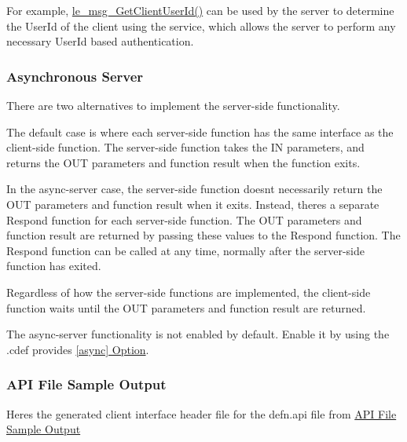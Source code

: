 For example, \hyperlink{le__messaging_8h_a8c04f9cad0a768b4922a9987df84b65f}{le\+\_\+msg\+\_\+\+Get\+Client\+User\+Id()} can be used by the server to determine the User\+Id of the client using the service, which allows the server to perform any necessary User\+Id based authentication.\hypertarget{interface_def_lang_c_interfaceDefLangC_asyncServer}{}\subsubsection{Asynchronous Server}\label{interface_def_lang_c_interfaceDefLangC_asyncServer}
There are two alternatives to implement the server-\/side functionality.

The default case is where each server-\/side function has the same interface as the client-\/side function. The server-\/side function takes the I\+N parameters, and returns the O\+U\+T parameters and function result when the function exits.

In the async-\/server case, the server-\/side function doesn\textquotesingle{}t necessarily return the O\+U\+T parameters and function result when it exits. Instead, there\textquotesingle{}s a separate {\ttfamily Respond} function for each server-\/side function. The O\+U\+T parameters and function result are returned by passing these values to the {\ttfamily Respond} function. The {\ttfamily Respond} function can be called at any time, normally after the server-\/side function has exited.

Regardless of how the server-\/side functions are implemented, the client-\/side function waits until the O\+U\+T parameters and function result are returned.

The async-\/server functionality is not enabled by default. Enable it by using the .cdef provides \hyperlink{def_files_cdef_defFilesCdef_providesApiAsync}{\mbox{[}async\mbox{]} Option}.\hypertarget{interface_def_lang_c_interfaceDefLangC_sampleAPI}{}\subsubsection{A\+P\+I File Sample Output}\label{interface_def_lang_c_interfaceDefLangC_sampleAPI}
Here\textquotesingle{}s the generated client interface header file for the defn.\+api file from \hyperlink{interface_def_lang_c_interfaceDefLangC_sampleAPI}{A\+P\+I File Sample Output}


